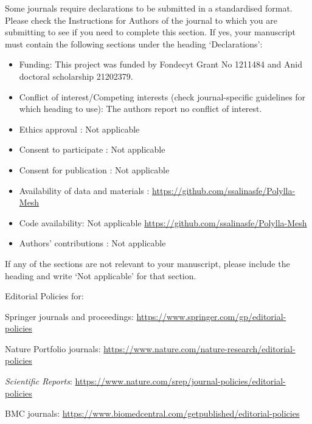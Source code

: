 \documentclass[lineno,pdflatex,sn-mathphys]{sn-jnl}%
\theoremstyle{thmstyleone}%
\theoremstyle{thmstyletwo}%
\theoremstyle{thmstylethree}%
\begin{document}
Some journals require declarations to be submitted in a standardised format. Please check the Instructions for Authors of the journal to which you are submitting to see if you need to complete this section. If yes, your manuscript must contain the following sections under the heading `Declarations':

\begin{itemize}
\item Funding: This project was funded by Fondecyt Grant No 1211484 and Anid doctoral scholarship 21202379.
\item Conflict of interest/Competing interests (check journal-specific guidelines for which heading to use): The authors report no conflict of interest.
\item Ethics approval : Not applicable
\item Consent to participate : Not applicable
\item Consent for publication : Not applicable
\item Availability of data and materials : \url{https://github.com/ssalinasfe/Polylla-Mesh}
\item Code availability: Not applicable \url{https://github.com/ssalinasfe/Polylla-Mesh}
\item Authors' contributions : Not applicable
\end{itemize}

\noindent
If any of the sections are not relevant to your manuscript, please include the heading and write `Not applicable' for that section. 

\bigskip
\begin{flushleft}%
    Editorial Policies for:

\bigskip\noindent
Springer journals and proceedings: \url{https://www.springer.com/gp/editorial-policies}

\bigskip\noindent
Nature Portfolio journals: \url{https://www.nature.com/nature-research/editorial-policies}

\bigskip\noindent
\textit{Scientific Reports}: \url{https://www.nature.com/srep/journal-policies/editorial-policies}

\bigskip\noindent
BMC journals: \url{https://www.biomedcentral.com/getpublished/editorial-policies}
\end{flushleft}
\end{document}
